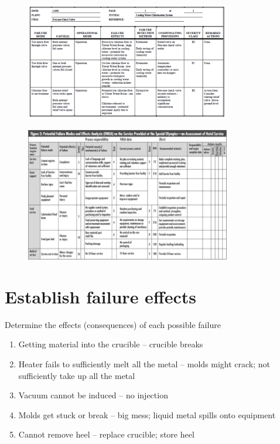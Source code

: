 \documentclass[aspectratio=1610,pdftex,dvipsnames,compress,xcolor={dvipsnames}]{beamer}
\begin{document}
\addtocounter{framenumber}{-1}
\begin{frame}{}
    \begin{figure}
        \centering
        \includegraphics[width=0.80\textwidth]{pressure.check.valve.jpg}
    \end{figure}
\end{frame}


\begin{frame}{}
    \begin{figure}
        \centering
        \includegraphics[width=0.80\textwidth]{hotel.service.jpg}
    \end{figure}
\end{frame}


\section{Establish failure effects}


\addtocounter{framenumber}{-1}
\begin{frame}{Determine the effects (consequences) of each possible failure}
    \begin{enumerate}[series=outerlist,topsep=0pt,itemsep=21pt,leftmargin=*,label=(\arabic*)]
        \item[]Getting material into the crucible -- crucible breaks
        \item[]Heater fails to sufficiently melt all the metal -- molds might crack; not sufficiently take up all the metal
        \item[]Vacuum cannot be induced -- no injection
        \item[]Molds get stuck or break -- big mess; liquid metal spills onto equipment
        \item[]Cannot remove heel -- replace crucible; store heel
    \end{enumerate}
\end{frame}
\end{document}

